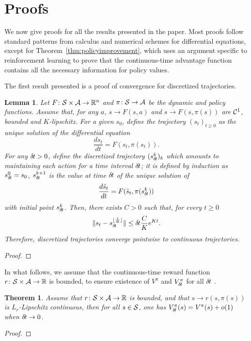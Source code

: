 \documentclass[11pt]{article}
\newtheorem{theorem}{Theorem}
\newtheorem{lemma}{Lemma}
\begin{document}
\section{Proofs}

We now give proofs for all the results presented in the paper. Most
proofs follow standard patterns from calculus and numerical schemes for
differential equations, except for Theorem~\ref{thm:policyimprovement},
which uses an argument specific to reinforcement learning to prove that
the continuous-time advantage function contains all the necessary
information for policy values.


The first result presented is a proof of convergence for discretized
trajectories.
\begin{lemma}
	Let $F\colon {\cal S} \times {\cal A} \rightarrow \mathbb{R}^n$ and $\pi\colon {\cal S}
	\rightarrow {\cal A}$ be the dynamic and policy functions. Assume that,
	for any $a$, $s \rightarrow F(s, a)$ and $s \rightarrow F(s, \pi(s))$
	are ${\cal C}^1$, bounded and $K$-lipschitz.  For
	a given $s_0$, define the trajectory $(s_t)_{t\geq 0}$ as the unique
	solution of the differential equation
	\begin{equation}
		\frac{ds_t}{dt} = F(s_t, \pi(s_t)).
		\label{eq:diff}
	\end{equation}
	For any ${\delta\hspace{-.1em}t} > 0$, define the discretized trajectory
	$(s_{\delta\hspace{-.1em}t}^k)_k$ which amounts to maintaining each action for a
	time interval ${\delta\hspace{-.1em}t}$; it is defined by induction as $s_{\delta\hspace{-.1em}t}^0 = s_0$,
	$s_{\delta\hspace{-.1em}t}^{k + 1}$ is the value at time ${\delta\hspace{-.1em}t}$ of
	the unique solution of
	\begin{equation}
		\frac{d\tilde{s}_t}{dt} = F(\tilde{s}_t, \pi(s_{\delta\hspace{-.1em}t}^k))
		\label{eq:diff_2}
	\end{equation}
	with initial point $s_{\delta\hspace{-.1em}t}^k$.
	Then, there exists $C > 0$ such that, for every $t \geq 0$
	\begin{equation}
		\|s_t - s_{\delta\hspace{-.1em}t}^{\lfloor \frac{t}{{\delta\hspace{-.1em}t}} \rfloor}\|
		\leq {\delta\hspace{-.1em}t} \frac{C}{K}e^{Kt}.
	\end{equation}
	Therefore, discretized trajectories converge pointwise to continuous trajectories.
	\label{th:traj-conv}
\end{lemma}
\begin{proof}
	
\end{proof}

In what follows, we assume that the continuous-time reward function $r\colon {\cal S} \times {\cal A} \rightarrow \mathbb{R}$
is bounded, to ensure existence of $V^\pi$ and $V^\pi_{\delta\hspace{-.1em}t}$ for all ${\delta\hspace{-.1em}t}$
.\begin{theorem}
	Assume that $r\colon {\cal S} \times {\cal A} \rightarrow \mathbb{R}$ is bounded, and
	that $s \rightarrow r(s, \pi(s))$ is $L_r$-Lipschitz continuous, then
	for all $s \in {\cal S}$, one has
	$V^\pi_{\delta\hspace{-.1em}t}(s) = V^\pi(s) + o(1)$
	when ${\delta\hspace{-.1em}t}\to 0$.
	\label{th:conv-value}
\end{theorem}
\begin{proof}
	
\end{proof}
\end{document}
